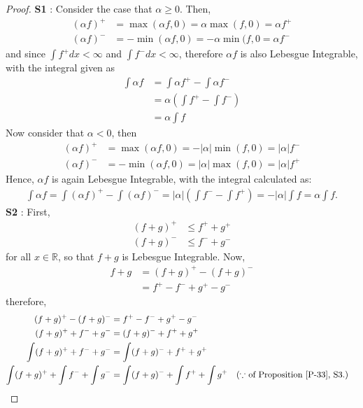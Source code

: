 \documentclass{article}
\theoremstyle{definition}
\theoremstyle{remark}
\theoremstyle{definition}
\theoremstyle{definition}
\theoremstyle{definition}
\newcommand{\abs}[1]{\left \vert #1\right \vert}
\newcommand{\R}{\mathbb{R}}
\begin{document}
\begin{proof}
	\textbf{S1} : Consider the case that $ \alpha \ge 0 $. Then,
	\begin{align*}
		(\alpha f)^{+} &= \max (\alpha f, 0) = \alpha \max(f,0) =\alpha f^{+}\\
		(\alpha f)^{-} &= -\min(\alpha f,0) = -\alpha \min (f,0 = \alpha f^{-} 
	\end{align*}
and since $ \int f^{+}dx <\infty$ and $ \int f^{-} dx < \infty$, therefore $ \alpha f $ is also Lebesgue Integrable, with the integral given as
\begin{align*}
	\int \alpha f &= \int \alpha f^{+} - \int \alpha f^{-}\\
	&= \alpha \left (\int f^{+} - \int f^{-}\right )\\
	&= \alpha \int f
\end{align*}
Now consider that $ \alpha  < 0 $, then
\begin{align*}
	(\alpha f)^{+} &= \max(\alpha f, 0) = -\abs{\alpha} \min(f,0) = \abs{\alpha} f^{-}\\
	(\alpha f)^{-} &= -\min(\alpha f, 0) = \abs{\alpha} \max (f,0) = \abs{\alpha} f^{+} 
\end{align*}
Hence, $ \alpha f $ is again Lebesgue Integrable, with the integral calculated as:
\begin{align*}
	\int \alpha f = \int (\alpha f)^{+} - \int (\alpha f)^{-} = \abs{\alpha} \left (\int f^{-} - \int f^{+}\right ) = -\abs{\alpha} \int f = \alpha \int f.
\end{align*}
\textbf{S2} : First,
\begin{align*}
	(f+g)^{+} &\le f^{+} + g^{+} \\
	(f+g)^{-} &\le f^{-} + g^{-}
\end{align*}
for all $ x\in \R $, so that $ f+g $ is Lebesgue Integrable. Now,
\begin{align*}
	f + g &= (f+g)^{+} - (f+g)^{-} \\
	&= f^{+} - f^{-} + g^{+} - g^{-}
\end{align*}
therefore,
\begin{align*}
	(f+g)^{+} - (f+g)^{-} &= f^{+} - f^{-} + g^{+} - g^{-}\\
	(f+g)^{+} + f^{-} + g^{-} &= (f+g)^{-} + f^{+} + g^{+}\\
	\int 	(f+g)^{+} + f^{-} + g^{-} &=  \int (f+g)^{-} + f^{+} + g^{+}\\
	\int	(f+g)^{+} + \int f^{-} + \int g^{-} &=\int (f+g)^{-} + \int f^{+} + \int g^{+}&&(\text{$ \because $ of Proposition \ref{P-33}, S3.})\\

\end{align*}
\end{proof}
\end{document}
